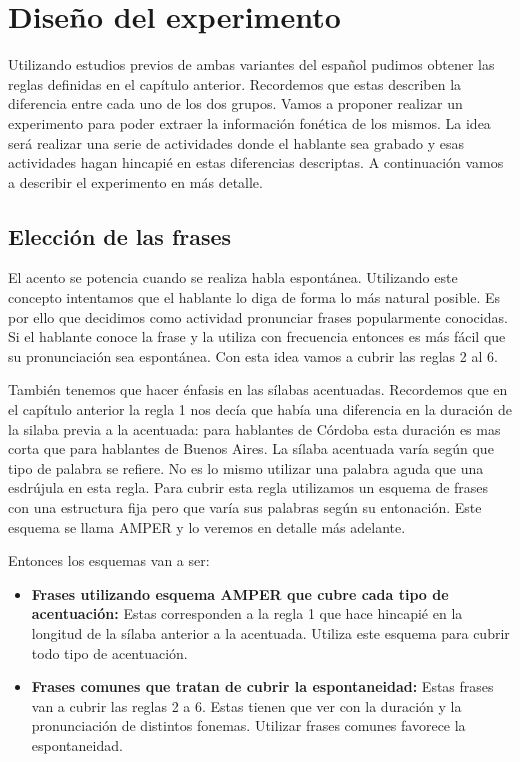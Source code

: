 \chapter{Diseño del experimento}

Utilizando estudios previos de ambas variantes del español pudimos obtener las reglas definidas en el capítulo anterior. Recordemos que estas describen la diferencia entre cada uno de los dos grupos. Vamos a proponer realizar un experimento para poder extraer la información fonética de los mismos. La idea será realizar una serie de actividades donde el hablante sea grabado y esas actividades hagan hincapié en estas diferencias descriptas. A continuación vamos a describir el experimento en más detalle.

\section{Elección de las frases}

El acento se potencia cuando se realiza habla espontánea. Utilizando este concepto intentamos que el hablante lo diga de forma lo más natural posible. Es por ello que decidimos como actividad pronunciar frases popularmente conocidas. Si el hablante conoce la frase y la utiliza con frecuencia entonces es más fácil que su pronunciación sea espontánea. Con esta idea vamos a cubrir las reglas 2 al 6. 

También tenemos que hacer énfasis en las sílabas acentuadas. Recordemos que en el capítulo anterior la regla 1 nos decía que había una diferencia en la duración de la silaba previa a la acentuada: para hablantes de Córdoba esta duración es mas corta que para hablantes de Buenos Aires. La sílaba acentuada varía según que tipo de palabra se refiere. No es lo mismo utilizar una palabra aguda que una esdrújula en esta regla. Para cubrir esta regla utilizamos un esquema de frases con una estructura fija pero que varía sus palabras según su entonación. Este esquema se llama AMPER y lo veremos en detalle más adelante.

Entonces los esquemas van a ser: 

\begin{itemize}
  \item \textbf{Frases utilizando esquema AMPER \cite{amper} que cubre cada tipo de acentuación:} Estas corresponden a la regla 1 que hace hincapié en la longitud de la sílaba anterior a la acentuada. Utiliza este esquema para cubrir todo tipo de acentuación.
  \item \textbf{Frases comunes que tratan de cubrir la espontaneidad:} Estas frases van a cubrir las reglas 2 a 6. Estas tienen que ver con la duración y la pronunciación de distintos fonemas. Utilizar frases comunes favorece la espontaneidad.
\end{itemize}

